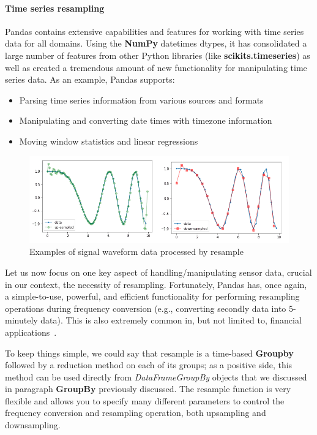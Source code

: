 \paragraph{Time series resampling}
Pandas contains extensive capabilities and features for working with time series data for all domains. Using the \textbf{NumPy} datetimes dtypes, it has consolidated a large number of features from other Python libraries (like \textbf{scikits.timeseries}) as well as created a tremendous amount of new functionality for manipulating time series data.
As an example, Pandas supports:
\begin{itemize}
    \item Parsing time series information from various sources and formats
    \item Manipulating and converting date times with timezone information
    \item Moving window statistics and linear regressions
\end{itemize}
\begin{figure}[ht]
    \centering
    \includegraphics[width=\textwidth]{content/chapter_3/images/up-down-sample.png}
    \caption{Examples of signal waveform data processed by resample}\label{fig:up and down sampling}
\end{figure}
Let us now focus on one key aspect of handling/manipulating sensor data, crucial in our context, the necessity of resampling.
Fortunately, Pandas has, once again, a simple-to-use, powerful, and efficient functionality for performing resampling operations during frequency conversion
(e.g., converting secondly data into 5-minutely data). This is also extremely common in, but not limited to, financial applications~\cite{Misc:pandas_docs}.

To keep things simple, we could say that resample is a time-based \textbf{Groupby} followed by a reduction method on each of its groups; as a positive side,
this method can be used directly from \textit{DataFrameGroupBy} objects that we discussed in paragraph \textbf{GroupBy} previously discussed.
The resample function is very flexible and allows you to specify many different parameters to control the frequency conversion and resampling operation, both upsampling and downsampling.
